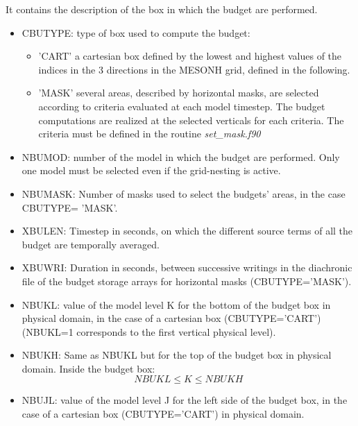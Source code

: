It contains the description of the box in which the budget are performed. 


\begin{itemize}

\item
{}
CBUTYPE: type of box used to compute the budget:
\begin{itemize}
\item
'CART' a cartesian box defined by the lowest and highest values of the indices
 in the 3 directions in the MESONH grid, defined in the following.
\item
'MASK' several areas, described by horizontal masks, are selected according to
 criteria evaluated at each model timestep. 
The budget computations are realized at the selected verticals for each
criteria. The criteria must be defined in the routine {\it set\_mask.f90}
\end{itemize}

\item
NBUMOD:  number of the model in which the
budget are performed. Only one model must be selected even if the grid-nesting
is active.

\item
NBUMASK: 
Number of masks used to select the budgets' areas, in the case CBUTYPE= 'MASK'. 

\item
XBULEN: 
Timestep  in seconds, on which the different source terms of all the
budget are temporally averaged.

\item
XBUWRI: 
Duration in seconds, between successive writings in the diachronic file
of the budget storage arrays for horizontal masks (CBUTYPE='MASK').

\item
{}
NBUKL: value of the model level K for the bottom of the budget box in physical domain, in the case
of a cartesian box (CBUTYPE='CART') (NBUKL=1 corresponds to the first vertical physical level).

\item
{}
NBUKH: Same as NBUKL but for the top of the budget box in physical domain. Inside the budget box:
$$ NBUKL \leq K \leq NBUKH $$

\item
{}
NBUJL: value of the model level J for the left side of the budget box, in the case
of a cartesian box (CBUTYPE='CART') in physical domain.


\end{itemize}
